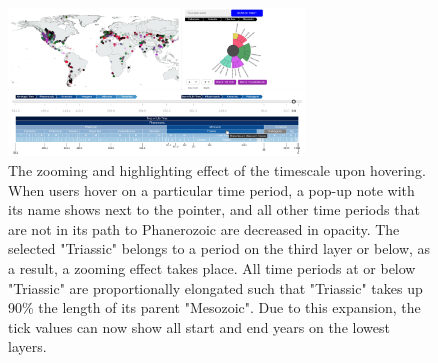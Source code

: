 \documentclass[11pt, a4paper,oneside,chapterprefix=false]{scrbook}
\begin{document}
\begin{figure}[h!]
	\centering
	\includegraphics[width=0.7\textwidth]{figures/technical_solution/time_control/time_hover}
	\caption{The zooming and highlighting effect of the timescale upon hovering. When users hover on a particular time period, a pop-up note with its name shows next to the pointer, and all other time periods that are not in its path to Phanerozoic are decreased in opacity. The selected "Triassic" belongs to a period on the third layer or below, as a result, a zooming effect takes place. All time periods at or below "Triassic" are proportionally elongated such that "Triassic" takes up 90\% the length of its parent "Mesozoic". Due to this expansion, the tick values can now show all start and end years on the lowest layers. }
	\label{fig:time_control_hover}
\end{figure}


\newpage
\end{document}
